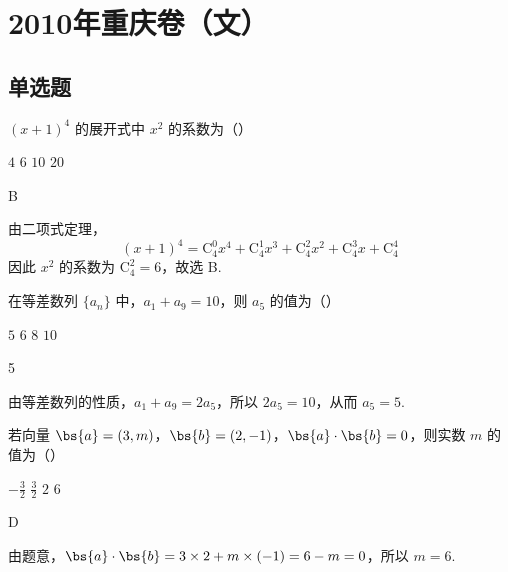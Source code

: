 \chapter{2010年重庆卷（文）}

\section{单选题}

\begin{problem}
\((x + 1)^{4}\) 的展开式中 \(x^{2}\) 的系数为（\quad）

\choices
    {\(4\)}
    {\(6\)}
    {\(10\)}
    {\(20\)}
\end{problem}

\begin{answer}
B
\end{answer}

\begin{solution}
由二项式定理，
\[
(x+1)^4=\mathrm C_4^0x^4+\mathrm C_4^1x^3+\mathrm C_4^2x^2+\mathrm C_4^3x+\mathrm C_4^4
\]
因此 \(x^2\) 的系数为 \(\mathrm C_4^2=6\)，故选 B.
\end{solution}

\begin{problem}
在等差数列 \(\{a_{n}\}\) 中，\(a_{1} + a_{9} = 10\)，则 \(a_{5}\) 的值为（\quad）

\choices
    {\(5\)}
    {\(6\)}
    {\(8\)}
    {\(10\)}
\end{problem}

\begin{answer}
5
\end{answer}

\begin{solution}
由等差数列的性质，\(a_{1}+a_{9}=2a_{5}\)，所以 \(2a_{5}=10\)，从而 \(a_{5}=5\).
\end{solution}

\begin{problem}
若向量 \(\bs{a} = (3, m)\)，\(\bs{b} = (2, -1)\)，\(\bs{a} \cdot \bs{b} = 0\)，则实数 \(m\) 的值为（\quad）

\choices
    {\(-\frac{3}{2}\)}
    {\( \frac{3}{2} \)}
    {\(2\)}
    {\(6\)}
\end{problem}

\begin{answer}
D
\end{answer}

\begin{solution}
由题意，\(\bs{a}\cdot\bs{b}=3\times2+m\times(-1)=6-m=0\)，所以 \(m=6\).
\end{solution}

